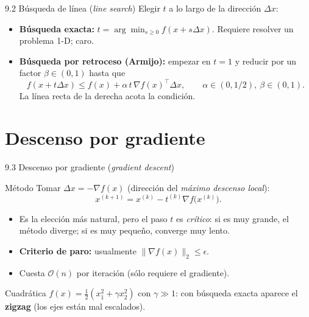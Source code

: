 \documentclass[10pt,aspectratio=169]{beamer}
\newcommand{\x}{\mathbf{x}}
\begin{document}
\begin{frame}{9.2 Búsqueda de línea (\emph{line search})}
  Elegir $t$ a lo largo de la dirección $\Delta x$:
  \begin{itemize}
    \item \textbf{Búsqueda exacta:} $t = \arg\min_{s \ge 0} f(x + s\Delta x)$.
          Requiere resolver un problema 1-D; caro.
    \item \textbf{Búsqueda por retroceso (Armijo):} empezar en $t = 1$ y reducir
          por un factor $\beta \in (0,1)$ hasta que
          \[
            f(x + t\Delta x) \le f(x) + \alpha\, t\, \nabla f(x)^{\top}\Delta x,
            \qquad \alpha \in (0, 1/2),\ \beta \in (0,1).
          \]
          La línea recta de la derecha acota la condición.
  \end{itemize}
  \begin{flushright}
  \end{flushright}
\end{frame}

\section{Descenso por gradiente}
\begin{frame}{9.3 Descenso por gradiente (\emph{gradient descent})}
  \begin{block}{Método}
    Tomar $\Delta x = -\nabla f(x)$ (dirección del \emph{máximo descenso local}):
    \[
      x^{(k+1)} = x^{(k)} - t^{(k)} \nabla f\!\bigl(x^{(k)}\bigr).
    \]
  \end{block}
  \begin{itemize}
    \item Es la elección más natural, pero el paso $t$ es \emph{crítico}:
          si es muy grande, el método diverge; si es muy pequeño, converge muy lento.
    \item \textbf{Criterio de paro:} usualmente $\|\nabla f(x)\|_{2} \le \epsilon$.
    \item Cuesta $\mathcal{O}(n)$ por iteración (sólo requiere el gradiente).
  \end{itemize}
  \begin{example}
    Cuadrática $f(x) = \tfrac{1}{2}(x_{1}^{2} + \gamma x_{2}^{2})$ con $\gamma \gg 1$:
    con búsqueda exacta aparece el \textbf{zigzag} (los ejes están mal escalados).
  \end{example}
\end{frame}
\end{document}
